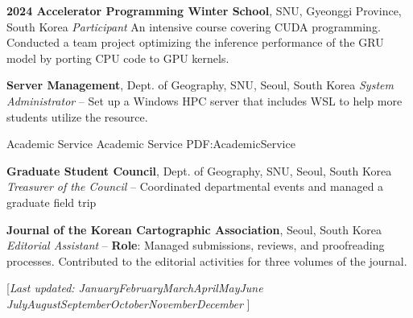 \documentclass[letterpaper,MMMyyyy,nonstopmode]{simpleresumecv}
\newcommand{\CVNote}{Last updated: %
  \ifcase\the\month
    \or January\or February\or March\or April\or May\or June
    \or July\or August\or September\or October\or November\or December
  \fi \space \the\year}
\begin{document}
\begin{Body}
\Entry
\textbf{2024 Accelerator Programming Winter School}, SNU, Gyeonggi Province, South Korea
\Gap
\textit{      Participant}
\hfill
{}
\Gap
\SubBulletItem
An intensive course covering CUDA programming.
\Gap
\SubBulletItem
Conducted a team project optimizing the inference performance of the GRU model by porting CPU code to GPU kernels.
\BigGap

\Entry
\textbf{Server Management}, Dept. of Geography, SNU, Seoul, South Korea
\Gap
\textit{      System Administrator}
\hfill
{} --
\Gap
\SubBulletItem
Set up a Windows HPC server that includes WSL to help more students utilize the resource.
\Gap



\Section
{Academic Service}
{Academic Service}
{PDF:AcademicService}

\Entry
\textbf{Graduate Student Council}, Dept. of Geography, SNU, Seoul, South Korea
\Gap
\textit{      Treasurer of the Council}
\hfill
{} --
\Gap
\SubBulletItem
Coordinated departmental events and managed a graduate field trip
\BigGap

\Entry
\textbf{Journal of the Korean Cartographic Association}, Seoul, South Korea
\Gap
\textit{       Editorial Assistant}
\hfill
{} --
\Gap
\SubBulletItem
\textbf{Role}: Managed submissions, reviews, and proofreading processes.
\Gap
\SubBulletItem
Contributed to the editorial activities for three volumes of the journal.
\BigGap

\end{Body}


\UseNoteFont%
\null\hfill%
[\textit{\CVNote}]
\end{document}
